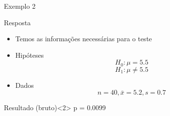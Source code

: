\documentclass{beamer}
\begin{document}

\begin{frame}{Exemplo 2}
  \begin{exampleblock}{Resposta}
    \begin{itemize}
    \footnotesize
  \item Temos as informações necessárias para o teste
  \item Hipóteses
      \begin{displaymath}
        H_0: \mu = 5.5
      \end{displaymath}
      \begin{displaymath}
        H_1: \mu \ne 5.5
      \end{displaymath}
    \item Dados
      \begin{displaymath}
        n=40, \bar{x} = 5.2, s = 0.7
      \end{displaymath}
    \end{itemize}
  \end{exampleblock}
  \begin{exampleblock}{Resultado (bruto)}<2>
    p = 0.0099
  \end{exampleblock}
\end{frame}
\end{document}
